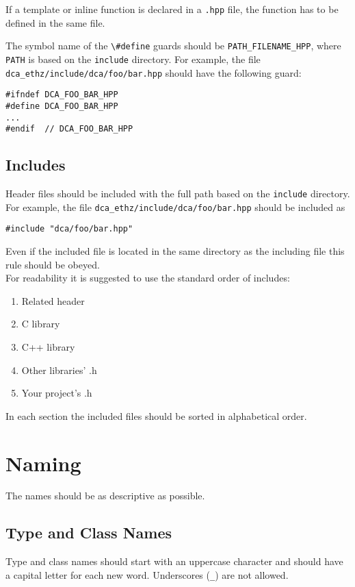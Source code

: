 \documentclass[a4paper]{article}
\newcommand{\inlinecode}[1]{\lstinline|#1|}
\begin{document}
If a template or inline function is declared in a \verb|.hpp| file, the function has to be defined in the same file.

The symbol name of the \inlinecode{\#define} guards should be \inlinecode{PATH_FILENAME_HPP}, where \inlinecode{PATH} is based on the \verb|include| directory. For example, the file\\ \verb|dca_ethz/include/dca/foo/bar.hpp| should have the following guard:

\begin{lstlisting}
#ifndef DCA_FOO_BAR_HPP
#define DCA_FOO_BAR_HPP
...
#endif  // DCA_FOO_BAR_HPP
\end{lstlisting}

\subsection{Includes}
Header files should be included with the full path based on the \verb|include| directory. For example, the file \verb|dca_ethz/include/dca/foo/bar.hpp| should be included as
\begin{lstlisting}
#include "dca/foo/bar.hpp"
\end{lstlisting}
Even if the included file is located in the same directory as the including file this rule should be obeyed. \\

For readability it is suggested to use the standard order of includes:
\begin{enumerate}
	\item Related header
	\item C library
	\item C++ library
	\item Other libraries' .h
	\item Your project's .h
\end{enumerate}
In each section the included files should be sorted in alphabetical order.
\section{Naming}

The names should be as descriptive as possible.

\subsection{Type and Class Names}

Type and class names should start with an uppercase character and should have a capital letter for each new word. Underscores (\inlinecode{_}) are not allowed.
\end{document}
